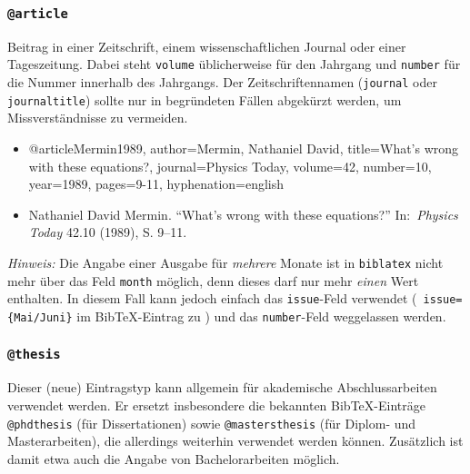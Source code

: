 \subsubsection{\texttt{@article}}
\label{sec:@article}
Beitrag in einer Zeitschrift, einem wissenschaftlichen Journal oder einer Tageszeitung.
Dabei steht \texttt{volume} üblicherweise für den Jahrgang und \texttt{number} für die 
Nummer innerhalb des Jahrgangs. Der Zeitschriftennamen (\texttt{journal} oder
\texttt{journaltitle}) sollte nur in begründeten Fällen abgekürzt werden, um Missverständnisse
zu vermeiden.
%
\begin{itemize}
\item[]
\begin{GenericCode}[numbers=none]
@article{Mermin1989,
	author={Mermin, Nathaniel David},
	title={What's wrong with these equations?},
	journal={Physics Today},
	volume={42},
	number={10},
	year={1989},
	pages={9-11},
	hyphenation={english}
}
\end{GenericCode}
\item[\cite{Mermin1989}]
Nathaniel David Mermin. "`What's wrong with these equations?"' In:\ \textit{Physics
Today} 42.10 (1989), S. 9--11.
\end{itemize}
%
\emph{Hinweis:} Die Angabe einer Ausgabe für \emph{mehrere} Monate ist in \texttt{biblatex} nicht mehr
über das Feld \texttt{month} möglich, denn dieses darf nur mehr \emph{einen} Wert enthalten.
In diesem Fall kann jedoch einfach das \texttt{issue}-Feld verwendet (\zB\ \verb!issue={Mai/Juni}!
im BibTeX-Eintrag zu \cite{Guttman2001}) und das \texttt{number}-Feld weggelassen werden.



\subsubsection{\texttt{@thesis}}
\label{sec:@thesis}
Dieser (neue) Eintragstyp kann allgemein für akademische Abschlussarbeiten verwendet werden. Er ersetzt
insbesondere die bekannten BibTeX-Einträge \texttt{@phdthesis} (für Dissertationen) sowie
\texttt{@mastersthesis} (für Di\-plom- und Masterarbeiten), die allerdings weiterhin verwendet werden können. Zusätzlich ist damit etwa auch die Angabe von Bachelorarbeiten möglich.

\bigskip %
